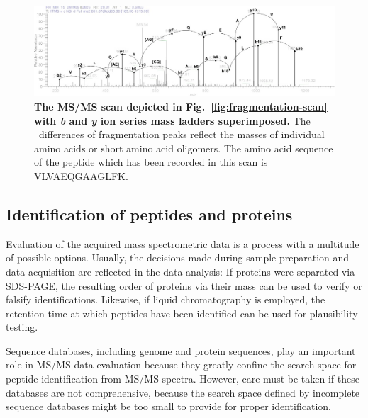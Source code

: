 \begin{figure}
\includegraphics[width=\textwidth]{figures/ms2-scan-b-y-1.jpg}
\caption{
{\bf The MS/MS scan depicted in Fig.~\ref{fig:fragmentation-scan} with {\em b} and 
{\em y} ion series mass ladders superimposed.} 
The \mz~differences of fragmentation peaks reflect the masses of individual amino
acids or short amino acid oligomers.
The amino acid sequence of the peptide which has been recorded in this
scan is VLVAEQGAAGLFK.
}
\label{fig:fragmentation-scan-b-y}
\end{figure}


\subsection{Identification of peptides and proteins}

Evaluation of the acquired mass spectrometric data is a process with a multitude
of possible options.
Usually, the decisions made during sample preparation and data acquisition are
reflected in the data analysis: If proteins were separated via SDS-PAGE, the
resulting order of proteins via their mass can be used to verify or falsify 
identifications.
Likewise, if liquid chromatography is employed, the retention time at which
peptides have been identified can be used for plausibility testing.

Sequence databases, including genome and protein sequences, play an important
role in MS/MS data evaluation because they greatly confine the search space
for peptide identification from MS/MS spectra.
However, care must be taken if these databases are not comprehensive, because
the search space defined by incomplete sequence databases might be too small
to provide for proper identification.



